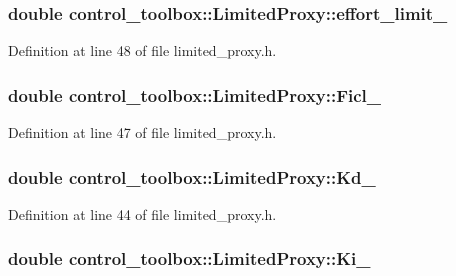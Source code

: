 \subsubsection[{effort\-\_\-limit\-\_\-}]{\setlength{\rightskip}{0pt plus 5cm}double {\bf control\-\_\-toolbox\-::\-Limited\-Proxy\-::effort\-\_\-limit\-\_\-}}\label{classcontrol__toolbox_1_1LimitedProxy_ae1565bc65562a69a8a98413f6ea1836c}


\-Definition at line 48 of file limited\-\_\-proxy.\-h.

\subsubsection[{\-Ficl\-\_\-}]{\setlength{\rightskip}{0pt plus 5cm}double {\bf control\-\_\-toolbox\-::\-Limited\-Proxy\-::\-Ficl\-\_\-}}\label{classcontrol__toolbox_1_1LimitedProxy_af9623015d5807c225cf2f994b04c2ee1}


\-Definition at line 47 of file limited\-\_\-proxy.\-h.

\subsubsection[{\-Kd\-\_\-}]{\setlength{\rightskip}{0pt plus 5cm}double {\bf control\-\_\-toolbox\-::\-Limited\-Proxy\-::\-Kd\-\_\-}}\label{classcontrol__toolbox_1_1LimitedProxy_a477eadf723c68624f0a08cab1dcc66d0}


\-Definition at line 44 of file limited\-\_\-proxy.\-h.

\subsubsection[{\-Ki\-\_\-}]{\setlength{\rightskip}{0pt plus 5cm}double {\bf control\-\_\-toolbox\-::\-Limited\-Proxy\-::\-Ki\-\_\-}}\label{classcontrol__toolbox_1_1LimitedProxy_a26af4eb37b8d0e2604a17dc34d225c87}


